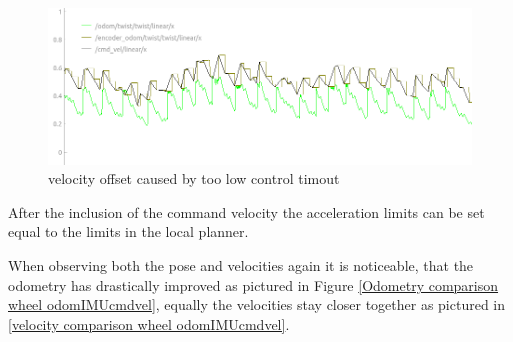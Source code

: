\begin{figure}
	\includegraphics[width=\textwidth]{Pictures/velocity comp}
	\caption{velocity offset caused by too low control timout}
	\label{velocity offset}

\end{figure}


After the inclusion of the command velocity the acceleration limits can be set equal to the limits in the local planner.

When observing both the pose and velocities again it is noticeable, that the odometry has drastically improved as pictured in Figure \ref{Odometry comparison wheel odomIMUcmdvel}, equally the velocities stay closer together as pictured in \ref{velocity comparison wheel odomIMUcmdvel}.

